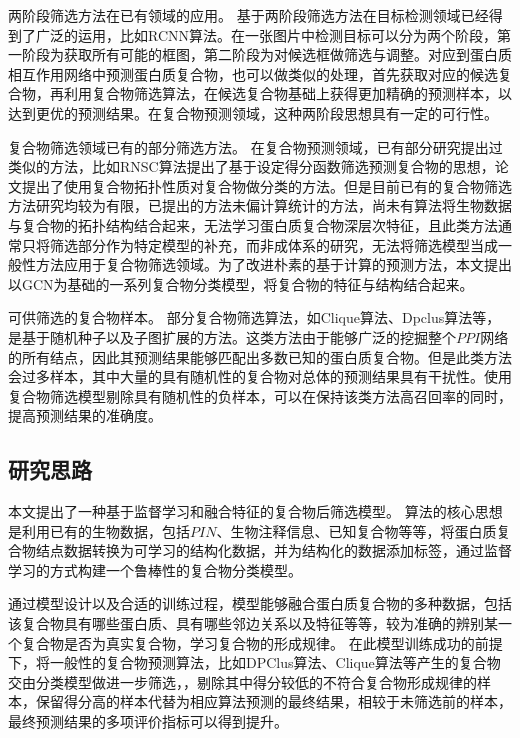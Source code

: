 两阶段筛选方法在已有领域的应用。
基于两阶段筛选方法在目标检测领域已经得到了广泛的运用，比如RCNN算法\cite{girshick_rich_2014}。在一张图片中检测目标可以分为两个阶段，第一阶段为获取所有可能的框图，第二阶段为对候选框做筛选与调整。对应到蛋白质相互作用网络中预测蛋白质复合物，也可以做类似的处理，首先获取对应的候选复合物，再利用复合物筛选算法，在候选复合物基础上获得更加精确的预测样本，以达到更优的预测结果。在复合物预测领域，这种两阶段思想具有一定的可行性。

复合物筛选领域已有的部分筛选方法。
在复合物预测领域，已有部分研究提出过类似的方法，比如RNSC算法\cite{king_protein_2004}提出了基于设定得分函数筛选预测复合物的思想，论文\cite{yu_predicting_2014}提出了使用复合物拓扑性质对复合物做分类的方法。但是目前已有的复合物筛选方法研究均较为有限，已提出的方法未偏计算统计的方法，尚未有算法将生物数据与复合物的拓扑结构结合起来，无法学习蛋白质复合物深层次特征，且此类方法通常只将筛选部分作为特定模型的补充，而非成体系的研究，无法将筛选模型当成一般性方法应用于复合物筛选领域。为了改进朴素的基于计算的预测方法，本文提出以GCN为基础的一系列复合物分类模型，将复合物的特征与结构结合起来。

可供筛选的复合物样本。
部分复合物筛选算法，如Clique算法\cite{spirin_protein_2003}、Dpclus算法等，是基于随机种子以及子图扩展的方法。这类方法由于能够广泛的挖掘整个$PPI$网络的所有结点，因此其预测结果能够匹配出多数已知的蛋白质复合物。但是此类方法会过多样本，其中大量的具有随机性的复合物对总体的预测结果具有干扰性。使用复合物筛选模型剔除具有随机性的负样本，可以在保持该类方法高召回率的同时，提高预测结果的准确度。

\subsection{研究思路}
\label{subsection:motivationAndThinking:thinking}

本文提出了一种基于监督学习和融合特征的复合物后筛选模型。
算法的核心思想是利用已有的生物数据，包括$PIN$、生物注释信息、已知复合物等等，将蛋白质复合物结点数据转换为可学习的结构化数据，并为结构化的数据添加标签，通过监督学习的方式构建一个鲁棒性的复合物分类模型。

通过模型设计以及合适的训练过程，模型能够融合蛋白质复合物的多种数据，包括该复合物具有哪些蛋白质、具有哪些邻边关系以及特征等等，较为准确的辨别某一个复合物是否为真实复合物，学习复合物的形成规律。
在此模型训练成功的前提下，将一般性的复合物预测算法，比如DPClus算法\cite{altaf-ul-amin_development_2006}、Clique算法\cite{spirin_protein_2003}等产生的复合物交由分类模型做进一步筛选，，剔除其中得分较低的不符合复合物形成规律的样本，保留得分高的样本代替为相应算法预测的最终结果，相较于未筛选前的样本，最终预测结果的多项评价指标可以得到提升。
